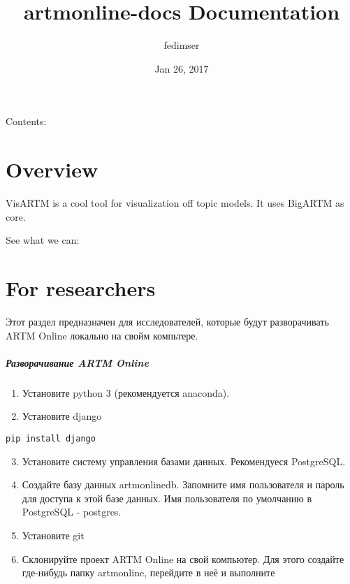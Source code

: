 \documentclass[letterpaper,10pt,english]{sphinxmanual}
\title{artmonline-docs Documentation}
\date{Jan 26, 2017}
\author{fedimser}
\begin{document}
\maketitle
\tableofcontents
{}\label{index::doc}


Contents:


\chapter{Overview}
\label{overview:visartm-documentation}\label{overview::doc}\label{overview:overview}
VisARTM is a cool tool for visualization off topic models. It uses BigARTM as core.

See what we can:


\chapter{For researchers}
\label{for_researchers::doc}\label{for_researchers:for-researchers}
Этот раздел предназначен для исследователей, которые будут разворачивать ARTM Online локально на свойм компьтере.
\paragraph{Разворачивание ARTM Online}
\begin{enumerate}
\item {} 
Установите python 3 (рекомендуется anaconda).

\item {} 
Установите django

\end{enumerate}

\begin{Verbatim}[commandchars=\\\{\}]
pip install django
\end{Verbatim}
\begin{enumerate}
\setcounter{enumi}{2}
\item {} 
Установите систему управления базами данных. Рекомендуеся PostgreSQL.

\item {} 
Создайте базу данных artmonlinedb. Запомните имя пользователя и пароль для доступа к этой базе данных. Имя пользователя по умолчанию в PostgreSQL - postgres.

\item {} 
Установите git

\item {} 
Склонируйте проект ARTM Online на свой компьютер. Для этого создайте где-нибудь папку artmonline, перейдите в неё и выполните

\end{enumerate}
\end{document}
